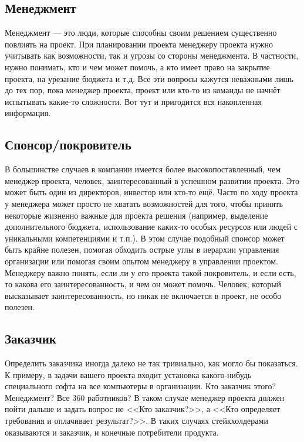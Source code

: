 \documentclass{../../text-style}
\begin{document}
\subsection{Менеджмент}

Менеджмент --- это люди, которые способны своим решением существенно повлиять на проект. При планировании проекта менеджеру проекта нужно учитывать как возможности, так и угрозы со стороны менеджмента. В частности, нужно понимать, кто и чем может помочь, а кто имеет право на закрытие проекта, на урезание бюджета и т.д. Все эти вопросы кажутся неважными лишь до тех пор, пока менеджер проекта, проект или кто-то из команды не начнёт испытывать какие-то сложности. Вот тут и пригодится вся накопленная информация.

\subsection{Спонсор/покровитель}

В большинстве случаев в компании имеется более высокопоставленный, чем менеджер проекта, человек, заинтересованный в успешном развитии проекта. Это может быть один из директоров, инвестор или кто-то ещё. Часто по ходу проекта у менеджера может просто не хватать возможностей для того, чтобы принять некоторые жизненно важные для проекта решения (например, выделение дополнительного бюджета, использование каких-то особых ресурсов или людей с уникальными компетенциями и т.п.). В этом случае подобный спонсор может быть крайне полезен, помогая обходить острые углы в иерархии управления организации или помогая своим опытом менеджеру в управлении проектом. 
Менеджеру важно понять, если ли у его проекта такой покровитель, и если есть, то какова его заинтересованность, и чем он может помочь. Человек, который высказывает заинтересованность, но никак не включается в проект, не особо полезен.

\subsection{Заказчик}

Определить заказчика иногда далеко не так тривиально, как могло бы показаться. К примеру, в задачи вашего проекта входит установка какого-нибудь специального софта на все компьютеры в организации. Кто заказчик этого? Менеджмент? Все 360 работников? В таком случае менеджер проекта должен пойти дальше и задать вопрос не <<Кто заказчик?>>, а <<Кто определяет требования и оплачивает результат?>>. В таких случаях стейкхолдерами оказываются и заказчик, и конечные потребители продукта.
\end{document}
